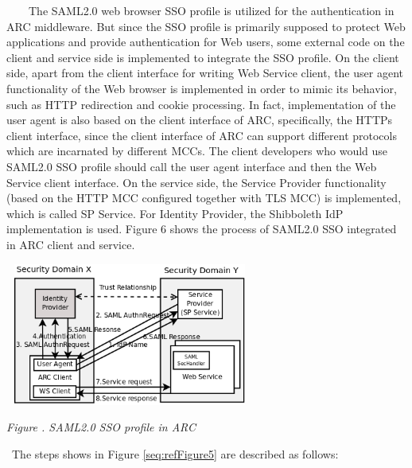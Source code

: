 \documentclass[a4paper]{article}
\newcounter{Figure}
\renewcommand\theFigure{\arabic{Figure}}
\begin{document}
{\upshape\color{black}
\ \ \ \ The SAML2.0 web browser SSO profile is utilized for the
authentication in ARC middleware. But since the SSO profile is
primarily supposed to protect Web applications and provide
authentication for Web users, some external code on the client and
service side is implemented to integrate the SSO profile. On the client
side, apart from the client interface for writing Web Service client,
the user agent functionality of the Web browser is implemented in order
to mimic its behavior, such as HTTP redirection and cookie processing.
In fact, implementation of the user agent is also based on the client
interface of ARC, specifically, the HTTPs client interface, since the
client interface of ARC can support different protocols which are
incarnated by different MCCs. The client developers who would use
SAML2.0 SSO profile should call the user agent interface and then the
Web Service client interface. On the service side, the Service Provider
functionality (based on the HTTP MCC configured together with TLS MCC)
is implemented, which is called SP Service. For Identity Provider, the
Shibboleth IdP implementation is used. Figure 6 shows the process of
SAML2.0 SSO integrated in ARC client and service.}


\bigskip

{\centering 
\includegraphics[width=3.2256in,height=1.8472in]{SecurityFrameworkofARC1-img7.png}
\par}

{\centering{}\itshape\color{black}
Figure
{\theFigure\label{seq:refFigure5}}.\textbf{
}SAML2.0 SSO profile in ARC
\par}

{\color{black}
\ The steps shows in Figure \ref{seq:refFigure5} are described as
follows:}
\end{document}
